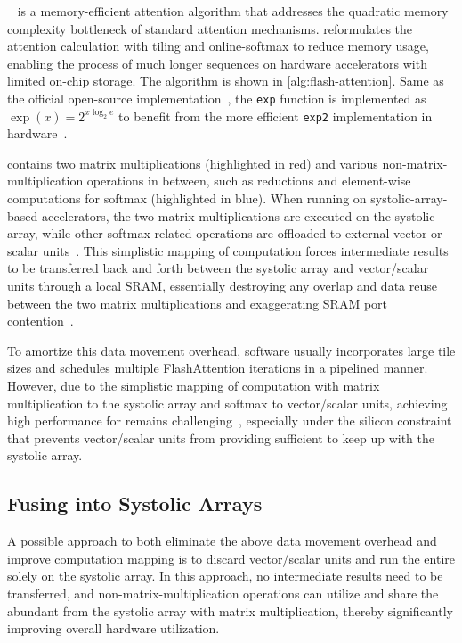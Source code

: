 \FA{}~\cite{fa2,fa3} is a memory-efficient attention algorithm that addresses the quadratic memory complexity bottleneck
of standard attention mechanisms.
\FA{} reformulates the attention calculation with tiling and online-softmax to reduce memory usage,
enabling the process of much longer sequences on hardware accelerators with limited on-chip storage.
The \FA{} algorithm is shown in \autoref{alg:flash-attention}.
Same as the official open-source \FA{} implementation~\cite{fa2},
the \texttt{exp} function is implemented as $\exp(x) = 2^{x \log_2 e}$ to benefit from the more
efficient \texttt{exp2} implementation in hardware~\cite{hwexp2}.

\FA{} contains two matrix multiplications (highlighted in red) and various non-matrix-multiplication operations in between,
such as reductions and element-wise computations for softmax (highlighted in blue).
When running \FA{} on systolic-array-based accelerators, the two matrix multiplications are executed on the systolic array,
while other softmax-related operations are offloaded to external vector or scalar units~\cite{trainium-arch}.
This simplistic mapping of computation forces intermediate results to be transferred back and forth between
the systolic array and vector/scalar units through a local SRAM,
essentially destroying any overlap and data reuse between the two matrix multiplications and exaggerating SRAM port contention~\cite{virgo,mosaic}.

To amortize this data movement overhead,
software usually incorporates large tile sizes and schedules multiple Flash\-Attention iterations in a pipelined manner.
However, due to the simplistic mapping of computation with matrix multiplication to the systolic array and softmax to vector/scalar units,
achieving high performance for \FA{} remains challenging~\cite{fusemax},
especially under the silicon constraint that prevents vector/scalar units from providing sufficient \FLOPs{}
to keep up with the systolic array.

\subsection{Fusing \FA{} into Systolic Arrays}

A possible approach to both eliminate the above data movement overhead and improve computation mapping is to discard vector/scalar units and run the entire \FA{} solely on the systolic array.
In this approach, no intermediate results need to be transferred,
and non-matrix-multiplication operations can utilize and share the abundant \FLOPs{} from the systolic array with matrix multiplication,
thereby significantly improving overall hardware utilization.

